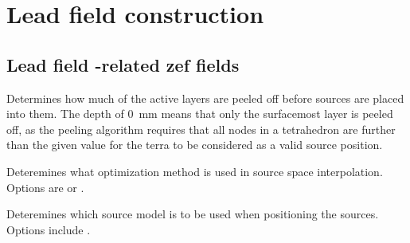 \section{Lead field construction}\label{sec:lead-field-construction}

\subsection{Lead field -related zef fields}\label{ssec:meshing-fields}

 Determines how much of the active
layers are peeled off before sources are placed into them. The depth of
\SI{0}{\milli\meter} means that only the surfacemost layer is peeled off, as
the peeling algorithm requires that all nodes in a tetrahedron are further
than the given value for the terra to be considered as a valid source
position.

 Deteremines what optimization
method is used in source space interpolation. Options are  or
.

 Deteremines which source model is to be used
when positioning the sources. Options include .
